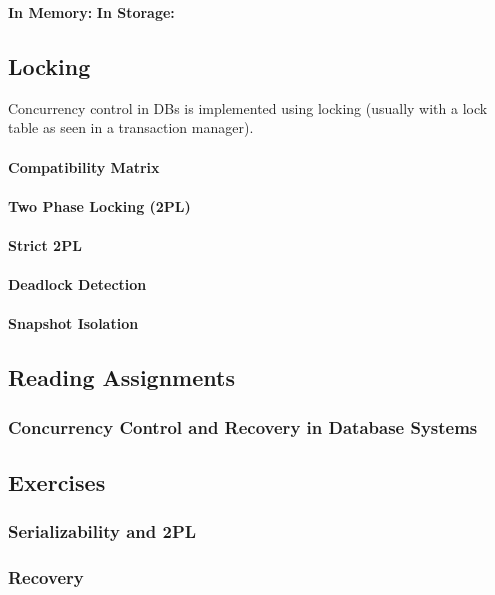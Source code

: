 \textbf{In Memory:} %
\textbf{In Storage:} %





\subsection{Locking}

Concurrency control in DBs is implemented using locking (usually with a lock table as seen in a transaction manager).

\paragraph{Compatibility Matrix}

\paragraph{Two Phase Locking (2PL)}

\paragraph{Strict 2PL}

\paragraph{Deadlock Detection}

\paragraph{Snapshot Isolation}







\subsection{Reading Assignments}

\subsubsection{Concurrency Control and Recovery in Database Systems}

\subsection{Exercises}

\subsubsection{Serializability and 2PL}

\subsubsection{Recovery}